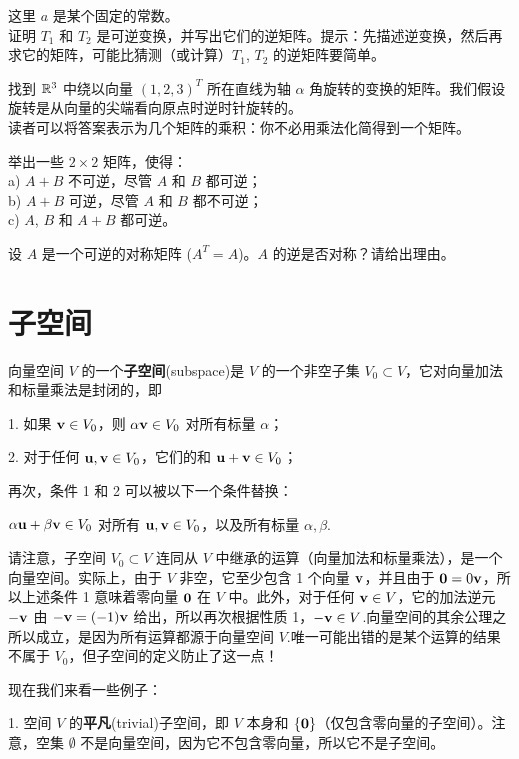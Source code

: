 \begin{problemset}
这里 $a$ 是某个固定的常数。
\\
证明 $T_1$ 和 $T_2$ 是可逆变换，并写出它们的逆矩阵。{\heiti 提示}：先描述逆变换，然后再求它的矩阵，可能比猜测（或计算）$T_1$, $T_2$ 的逆矩阵要简单。
\item \label{ex:01-06-11} 找到 $\mathbb{R}^3$ 中绕以向量 $(1, 2, 3)^T$ 所在直线为轴 $\alpha$ 角旋转的变换的矩阵。我们假设旋转是从向量的尖端看向原点时逆时针旋转的。
\\
读者可以将答案表示为几个矩阵的乘积：你不必用乘法化简得到一个矩阵。
\item \label{ex:01-06-12} 举出一些 $2 \times 2$ 矩阵，使得：
\\
a) $A+B$ 不可逆，尽管 $A$ 和 $B$ 都可逆；
\\
b) $A+B$ 可逆，尽管 $A$ 和 $B$ 都不可逆；
\\
c) $A$, $B$ 和 $A+B$ 都可逆。
\item \label{ex:01-06-13} 设 $A$ 是一个可逆的对称矩阵 ($A^T = A$)。$A$ 的逆是否对称？请给出理由。
\end{problemset}

\section{子空间}\label{sec:01-07}

向量空间 $V$ 的一个\textbf{子空间}(subspace)是 $V$ 的一个非空子集 $V_0 \subset V$，它对向量加法和标量乘法是封闭的，即

1. 如果 $\mathbf{v} \in V_0$，则 $\alpha \mathbf{v} \in V_0$ 对所有标量 $\alpha$；

2. 对于任何 $\mathbf{u}, \mathbf{v} \in V_0$，它们的和 $\mathbf{u} + \mathbf{v} \in V_0$；

再次，条件 1 和 2 可以被以下一个条件替换：

$\alpha \mathbf{u} + \beta \mathbf{v} \in V_0$ 对所有 $\mathbf{u}, \mathbf{v} \in V_0$，以及所有标量 $\alpha, \beta$.~

请注意，子空间 $V_0 \subset V$ 连同从 $V$ 中继承的运算（向量加法和标量乘法），是一个向量空间。实际上，由于 $V$ 非空，它至少包含 1 个向量 $\mathbf{v}$，并且由于 $\mathbf{0} = 0\mathbf{v}$，所以上述条件 1 意味着零向量 $\mathbf{0}$ 在 $V$ 中。此外，对于任何 $\mathbf{v} \in V$，它的加法逆元 $-\mathbf{v}$ 由 $-\mathbf{v} = (-1)\mathbf{v}$ 给出，所以再次根据性质 1，$-\mathbf{v} \in V$.向量空间的其余公理之所以成立，是因为所有运算都源于向量空间 $V$.唯一可能出错的是某个运算的结果不属于 $V_0$，但子空间的定义防止了这一点！

现在我们来看一些例子：

1. 空间 $V$ 的\textbf{平凡}(trivial)子空间，即 $V$ 本身和 $\{\mathbf{0}\}$（仅包含零向量的子空间）。注意，空集 $\emptyset$ 不是向量空间，因为它不包含零向量，所以它不是子空间。

